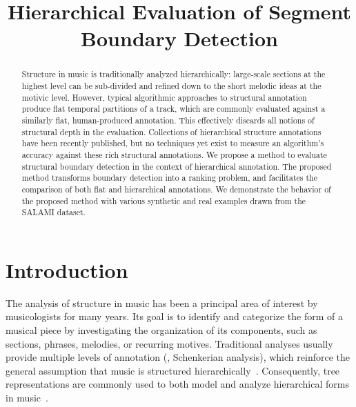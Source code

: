 \documentclass{article}
\title{Hierarchical Evaluation of Segment Boundary Detection}
\begin{document}
%
\maketitle
%
\begin{abstract}
Structure in music is traditionally analyzed hierarchically: large-scale sections at the highest level can be sub-divided and refined down to the short melodic ideas at the motivic level. 
However, typical algorithmic approaches to structural annotation produce flat temporal partitions of a track, which are commonly evaluated against a similarly flat, human-produced
annotation. This effectively discards all notions of structural depth in the evaluation.
Collections of hierarchical structure annotations have been recently published, but no techniques yet exist to
measure an algorithm's accuracy against these rich structural annotations.
We propose a method to evaluate structural boundary detection in the context of hierarchical annotation.
The proposed method transforms boundary detection into a ranking problem, and facilitates the comparison of
both flat and hierarchical annotations.
We demonstrate the behavior of the proposed method with various synthetic and real
examples drawn from the SALAMI dataset. 
\end{abstract}
%
\section{Introduction}\label{sec:introduction}

The analysis of structure in music has been a principal area of interest by musicologists for many years.
Its goal is to identify and categorize the form of a musical piece by investigating the organization of its components, such as sections, phrases, melodies, or recurring motives.
Traditional analyses usually provide multiple levels of annotation (\eg, Schenkerian analysis), which reinforce the general assumption that music is structured hierarchically~\cite{Lerdahl1983a}.
Consequently, tree representations are commonly used to both model and analyze hierarchical forms in music~\cite{Lerdahl1983}.
\end{document}
